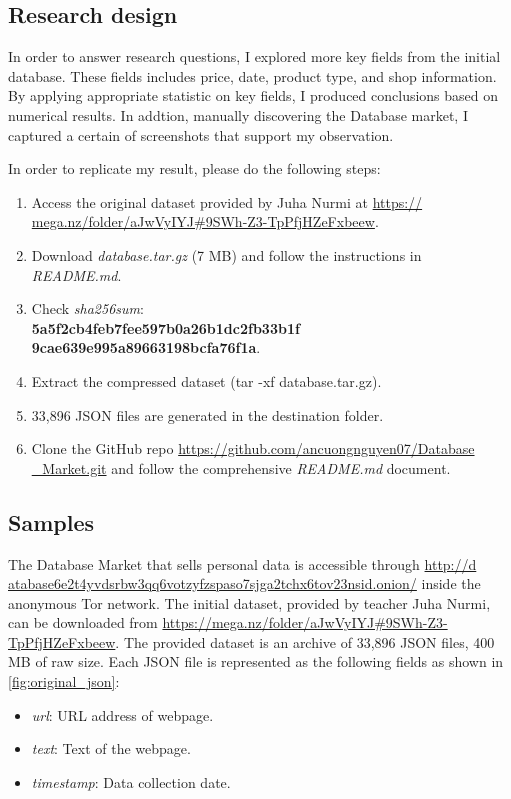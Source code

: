 \subsection{Research design}
In order to answer research questions, I explored more key fields from the initial
database. These fields includes price, date, product type, and shop information.
By applying appropriate statistic on key fields, I produced conclusions based on
numerical results. In addtion, manually discovering the Database market, I captured
a certain of screenshots that support my observation.

In order to replicate my result, please do the following steps:

\begin{enumerate}
    \item Access the original dataset provided by Juha Nurmi at \url{https://
    mega.nz/folder/aJwVyIYJ#9SWh-Z3-TpPfjHZeFxbeew}.
    \item Download \emph{database.tar.gz} (7 MB) and follow the instructions
    in \emph{README.md}.
    \item Check \emph{sha256sum}:\\\textbf{5a5f2cb4feb7fee597b0a26b1dc2fb33b1f
    9cae639e995a89663198bcfa76f1a}.
    \item Extract the compressed dataset (tar -xf database.tar.gz).
    \item 33,896 JSON files are generated in the destination folder.
    \item Clone the GitHub repo \url{https://github.com/ancuongnguyen07/Database
    _Market.git} and follow the comprehensive \emph{README.md} document.
\end{enumerate}

\subsection{Samples}
%
The Database Market that sells personal data is accessible through \url{http://d
atabase6e2t4yvdsrbw3qq6votzyfzspaso7sjga2tchx6tov23nsid.onion/} inside the
anonymous Tor network. The initial dataset, provided by teacher Juha Nurmi, can
be downloaded from \url{https://mega.nz/folder/aJwVyIYJ#9SWh-Z3-
TpPfjHZeFxbeew}.
The provided dataset is an archive of 33,896 JSON files, 400 MB of raw size. Each
JSON file is represented as the following fields as shown in \autoref{fig:original_json}:

\begin{itemize}
    \item \emph{url}: URL address of webpage.
    \item \emph{text}: Text of the webpage.
    \item \emph{timestamp}: Data collection date.
\end{itemize}

